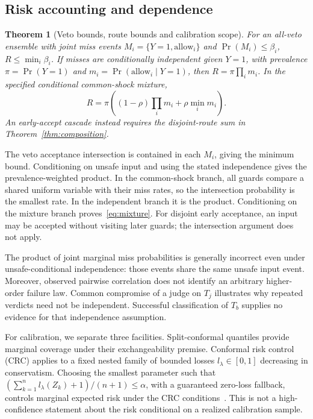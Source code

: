 ﻿\documentclass[lettersize,journal]{IEEEtran}
\newtheorem{theorem}{Theorem}
\begin{document}
\subsection{Risk accounting and dependence}
\begin{theorem}[Veto bounds, route bounds and calibration scope]
\label{thm:bounds}
For an all-veto ensemble with joint miss events
$M_i=\{Y=1,\mathrm{allow}_i\}$ and $\Pr(M_i)\leq\beta_i$,
$R\leq\min_i\beta_i$. If misses are conditionally independent given $Y=1$,
with prevalence $\pi=\Pr(Y=1)$ and
$m_i=\Pr(\mathrm{allow}_i\mid Y=1)$, then
$R=\pi\prod_i m_i$. In the specified conditional common-shock mixture,
\begin{equation}
R=\pi\left((1-\rho)\prod_i m_i+\rho\min_i m_i\right).
\label{eq:mixture}
\end{equation}
An early-accept cascade instead requires the disjoint-route sum in
Theorem~\ref{thm:composition}.
\end{theorem}
\begin{IEEEproof}
The veto acceptance intersection is contained in each $M_i$, giving the
minimum bound. Conditioning on unsafe input and using the stated independence
gives the prevalence-weighted product. In the common-shock branch, all guards
compare a shared uniform variable with their miss rates, so the intersection
probability is the smallest rate. In the independent branch it is the product.
Conditioning on the mixture branch proves~\eqref{eq:mixture}. For disjoint
early acceptance, an input may be accepted without visiting later guards;
the intersection argument does not apply.
\end{IEEEproof}

The product of joint marginal miss probabilities is generally incorrect even
under unsafe-conditional independence: those events share the same unsafe
input event. Moreover, observed pairwise correlation does not identify an
arbitrary higher-order failure law. Common compromise of a judge on $T_j$
illustrates why repeated verdicts need not be independent. Successful
classification of $T_b$ supplies no evidence for that independence assumption.

For calibration, we separate three facilities. Split-conformal quantiles
provide marginal coverage under their exchangeability premise. Conformal risk
control (CRC) applies to a fixed nested family of bounded losses
$l_\lambda\in[0,1]$ decreasing in conservatism. Choosing the smallest parameter
such that $(\sum_{k=1}^n l_\lambda(Z_k)+1)/(n+1)\leq\alpha$, with a guaranteed
zero-loss fallback, controls marginal expected risk under the CRC
conditions~\cite{arxiv220802814}. This is not a high-confidence statement about
the risk conditional on a realized calibration sample.
\end{document}
